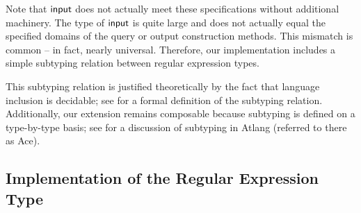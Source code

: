 \documentclass[9pt]{sig-alternate}
\theoremstyle{definition}
\begin{document}
Note that ${\sf input}$ does not actually meet these specifications without additional machinery.
The type of ${\sf input}$ is quite large
and does not actually equal the specified domains of the query or output construction
methods. This mismatch is common -- in fact, nearly universal. Therefore, 
our implementation includes a simple subtyping relation between regular expression
types. 

This subtyping relation is justified theoretically by the fact that language inclusion is
decidable; see \cite{fulton12} for a formal definition of the subtyping relation.
Additionally, our extension remains composable because subtyping is defined on a type-by-type basis;
see \cite{fulton13} for a discussion of subtyping in Atlang (referred to there as Ace).

\subsection{Implementation of the Regular Expression Type}
\end{document}
